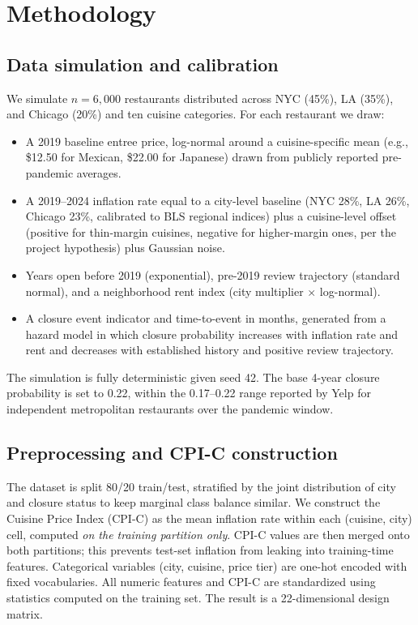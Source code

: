 \documentclass{article}
\begin{document}
\section{Methodology}

\subsection{Data simulation and calibration}
We simulate $n = 6{,}000$ restaurants distributed across NYC (45\%), LA (35\%), and Chicago (20\%) and ten cuisine categories. For each restaurant we draw:
\begin{itemize}
\item A 2019 baseline entree price, log-normal around a cuisine-specific mean (e.g., \$12.50 for Mexican, \$22.00 for Japanese) drawn from publicly reported pre-pandemic averages.
\item A 2019--2024 inflation rate equal to a city-level baseline (NYC 28\%, LA 26\%, Chicago 23\%, calibrated to BLS regional indices) plus a cuisine-level offset (positive for thin-margin cuisines, negative for higher-margin ones, per the project hypothesis) plus Gaussian noise.
\item Years open before 2019 (exponential), pre-2019 review trajectory (standard normal), and a neighborhood rent index (city multiplier $\times$ log-normal).
\item A closure event indicator and time-to-event in months, generated from a hazard model in which closure probability increases with inflation rate and rent and decreases with established history and positive review trajectory.
\end{itemize}
The simulation is fully deterministic given seed 42. The base 4-year closure probability is set to 0.22, within the 0.17--0.22 range reported by Yelp for independent metropolitan restaurants over the pandemic window.

\subsection{Preprocessing and CPI-C construction}
The dataset is split 80/20 train/test, stratified by the joint distribution of city and closure status to keep marginal class balance similar. We construct the Cuisine Price Index (CPI-C) as the mean inflation rate within each (cuisine, city) cell, computed \emph{on the training partition only}. CPI-C values are then merged onto both partitions; this prevents test-set inflation from leaking into training-time features. Categorical variables (city, cuisine, price tier) are one-hot encoded with fixed vocabularies. All numeric features and CPI-C are standardized using statistics computed on the training set. The result is a 22-dimensional design matrix.
\end{document}
